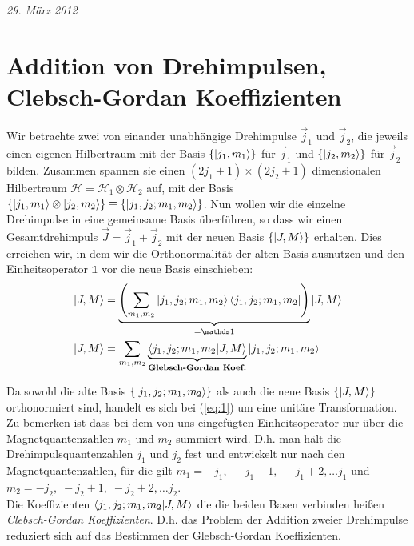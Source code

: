 





\textit{29. März 2012}



\section*{Addition von Drehimpulsen,\\
  Clebsch-Gordan Koeffizienten}
\label{sec:addit-von-dreh}

Wir betrachte zwei von einander unabhängige Drehimpulse \(\vec j_1\) und \(\vec
j_2\), die jeweils einen eigenen Hilbertraum mit der Basis \(\{\left| j_1,m_1 \right\rangle\}\)
für \(\vec j_1\) und \(\{\left| j_2,m_2 \right\rangle\}\) für \(\vec j_2\) bilden. Zusammen
spannen sie einen \((2j_1+1) \times (2j_2+1)\) dimensionalen Hilbertraum
\(\mathcal H = \mathcal H_1 \otimes \mathcal H_2\) auf, mit der Basis
\(\{\left| j_1,m_1 \right\rangle \otimes \left| j_2,m_2 \right\rangle\} \equiv \{\left| j_1,j_2;m_1,m_2 \right\rangle\}\).
Nun wollen wir die einzelne Drehimpulse in eine gemeinsame Basis überführen, so
dass wir einen Gesamtdrehimpuls \(\vec J=\vec j_1+\vec j_2\) mit der neuen Basis
\(\{\left| J,M \right\rangle\}\) erhalten. Dies erreichen wir, in dem wir die Orthonormalität
der alten Basis ausnutzen und den Einheitsoperator \(\mathds 1\) vor die neue
Basis einschieben:
\begin{align}
  \label{eq:1}
  \ket{J,M}&=\underbrace{\left(
      \sum_{m_1,m_2}\ket{j_1,j_2;m_1,m_2}\bra{j_1,j_2;m_1,m_2}
    \right)}_{= \mathds 1}
  \ket{J,M}\notag\\
   \ket{J,M}&= \sum_{m_1,m_2} 
   \underbrace{\braket{j_1,j_2;m_1,m_2}{J,M}}_
   {\text{\textbf{Glebsch-Gordan Koef.}}}
   \ket{j_1,j_2;m_1,m_2}
\end{align}

Da sowohl die alte Basis \( \{\left| j_1,j_2;m_1,m_2 \right\rangle\}\) als auch die neue Basis
\(\{\left| J,M \right\rangle\}\) orthonormiert sind, handelt es sich bei (\ref{eq:1}) um eine
unitäre Transformation. Zu bemerken ist dass bei dem von uns eingefügten
Einheitsoperator nur über die Magnetquantenzahlen \(m_1\) und \(m_2\) summiert
wird. D.h. man hält die Drehimpulsquantenzahlen \(j_1\) und \(j_2\) fest und
entwickelt nur nach den Magnetquantenzahlen, für die gilt \(m_1 = -j_1,\; -j_1+1,
\;-j_1+2, \dots j_1\) und \(m_2 = -j_2, \;-j_2+1,\;-j_2+2, \dots j_2\).\\
Die Koeffizienten \( \braket{j_1,j_2;m_1,m_2}{J,M} \) die die beiden Basen verbinden
heißen \emph{Clebsch-Gordan Koeffizienten}. D.h. das Problem der Addition zweier
Drehimpulse reduziert sich auf das Bestimmen der Glebsch-Gordan Koeffizienten.

